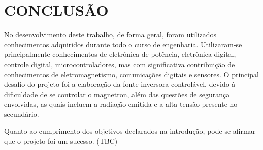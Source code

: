 \chapter{CONCLUSÃO}
\label{chap:conclusao}


No desenvolvimento deste trabalho, de forma geral, foram utilizados conhecimentos adquiridos durante todo o curso de engenharia. Utilizaram-se principalmente conhecimentos de eletrônica de potência, eletrônica digital, controle digital, microcontroladores, mas com significativa contribuição de conhecimentos de eletromagnetismo, comunicações digitais e  sensores. O principal desafio do projeto foi a elaboração da fonte inversora controlável, devido à dificuldade de se controlar o magnetron, além das questões de segurança envolvidas, as quais incluem a radiação emitida e a alta tensão presente no secundário.

Quanto ao cumprimento dos objetivos declarados na introdução, pode-se afirmar que o projeto foi um sucesso.
(TBC)